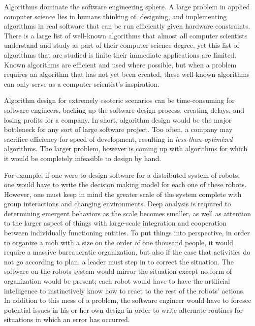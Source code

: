\documentclass[letterpaper, 10pt]{article}
\begin{document}
	Algorithms dominate the software engineering sphere. A large problem in applied computer science lies in humans thinking of, designing, and implementing algorithms in real software that can be run efficiently given hardware constraints. There is a large list of well-known algorithms that almost all computer scientists understand and study as part of their computer science degree, yet this list of algorithms that are studied is finite their immediate applications are limited. Known algorithms are efficient and used where possible, but when a problem requires an algorithm that has not yet been created, these well-known algorithms can only serve as a computer scientist's inspiration.
	
	Algorithm design for extremely esoteric scenarios can be time-consuming for software engineers, backing up the software design process, creating delays, and losing profits for a company. In short, algorithm design would be the major bottleneck for any sort of large software project. Too often, a company may sacrifice efficiency for speed of development, resulting in \emph{less-than-optimized} algorithms. The larger problem, however is coming up with algorithms for which it would be completely infeasible to design by hand.
	
	For example, if one were to design software for a distributed system of robots, one would have to write the decision making model for each one of these robots. However, one must keep in mind the greater scale of the system complete with group interactions and changing environments. Deep analysis is required to determining emergent behaviors as the scale becomes smaller, as well as attention to the larger aspect of things with large-scale integration and cooperation between individually functioning entities. To put things into perspective, in order to organize a mob with a size on the order of one thousand people, it would require a massive bureaucratic organization, but also if the case that activities do not go according to plan, a leader must step in to correct the situation. The software on the robots system would mirror the situation except no form of organization would be present; each robot would have to have the artificial intelligence to instinctively know how to react to the rest of the robots' actions. In addition to this mess of a problem, the software engineer would have to foresee potential issues in his or her own design in order to write alternate routines for situations in which an error has occurred.
	
\end{document}
